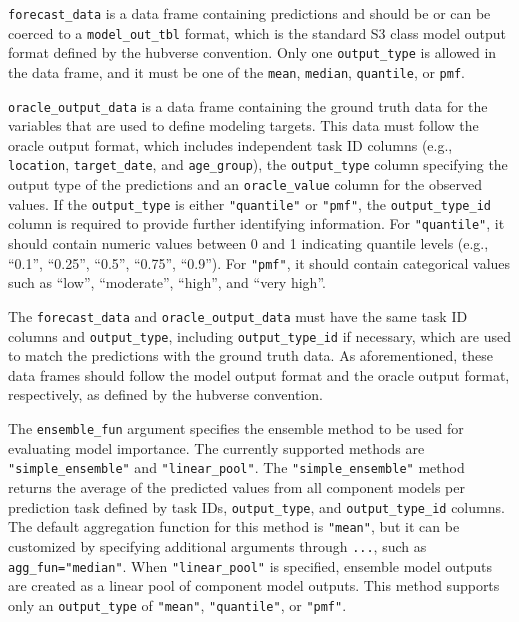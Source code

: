 \documentclass[
  article,
  shortnames,
  notitle]{jss}
\begin{document}
\texttt{forecast\_data} is a data frame containing predictions and
should be or can be coerced to a \texttt{model\_out\_tbl} format, which
is the standard S3 class model output format defined by the hubverse
convention. Only one \texttt{output\_type} is allowed in the data frame,
and it must be one of the \texttt{mean}, \texttt{median},
\texttt{quantile}, or \texttt{pmf}.

\texttt{oracle\_output\_data} is a data frame containing the ground
truth data for the variables that are used to define modeling targets.
This data must follow the oracle output format, which includes
independent task ID columns (e.g., \texttt{location},
\texttt{target\_date}, and \texttt{age\_group}), the
\texttt{output\_type} column specifying the output type of the
predictions and an \texttt{oracle\_value} column for the observed
values. If the \texttt{output\_type} is either \texttt{"quantile"} or
\texttt{"pmf"}, the \texttt{output\_type\_id} column is required to
provide further identifying information. For \texttt{"quantile"}, it
should contain numeric values between 0 and 1 indicating quantile levels
(e.g., ``0.1'', ``0.25'', ``0.5'', ``0.75'', ``0.9''). For
\texttt{"pmf"}, it should contain categorical values such as ``low'',
``moderate'', ``high'', and ``very high''.

The \texttt{forecast\_data} and \texttt{oracle\_output\_data} must have
the same task ID columns and \texttt{output\_type}, including
\texttt{output\_type\_id} if necessary, which are used to match the
predictions with the ground truth data. As aforementioned, these data
frames should follow the model output format and the oracle output
format, respectively, as defined by the hubverse convention.

The \texttt{ensemble\_fun} argument specifies the ensemble method to be
used for evaluating model importance. The currently supported methods
are \texttt{"simple\_ensemble"} and \texttt{"linear\_pool"}. The
\texttt{"simple\_ensemble"} method returns the average of the predicted
values from all component models per prediction task defined by task
IDs, \texttt{output\_type}, and \texttt{output\_type\_id} columns. The
default aggregation function for this method is \texttt{"mean"}, but it
can be customized by specifying additional arguments through
\texttt{...}, such as \texttt{agg\_fun="median"}. When
\texttt{"linear\_pool"} is specified, ensemble model outputs are created
as a linear pool of component model outputs. This method supports only
an \texttt{output\_type} of \texttt{"mean"}, \texttt{"quantile"}, or
\texttt{"pmf"}.
\end{document}
